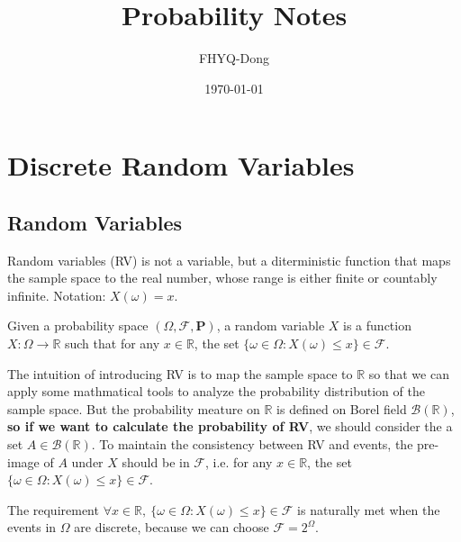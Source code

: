 \documentclass[device=normal, lang=en, fontsize=12pt]{elegantnote}
\title{Probability Notes}
\author{FHYQ-Dong}
\date{\today}
\numberwithin{equation}{section}
\theoremstyle{definition} %
\begin{document}
\maketitle
\newpage
\tableofcontents
\newpage






\section{Discrete Random Variables}
\subsection{Random Variables}
Random variables (RV) is not a variable, but a diterministic function that maps the sample space to the real number, whose range is either finite or countably infinite. Notation: $X(\omega) = x$.
\begin{definition}
    Given a probability space $(\varOmega, \mathcal{F}, \mathbf{P})$, a random variable $X$ is a function $X: \varOmega \rightarrow \mathbb{R}$ such that for any $x \in \mathbb{R}$, the set $\{\omega \in \varOmega: X(\omega) \leq x\} \in \mathcal{F}$.
\end{definition}
The intuition of introducing RV is to map the sample space to $\mathbb{R}$ so that we can apply some mathmatical tools to analyze the probability distribution of the sample space. But the probability meature on $\mathbb{R}$ is defined on Borel field $\mathcal{B}(\mathbb{R})$, \textbf{so if we want to calculate the probability of RV}, we should consider the a set $A \in \mathcal{B}(\mathbb{R})$. To maintain the consistency between RV and events, the pre-image of $A$ under $X$ should be in $\mathcal{F}$, i.e. for any $x \in \mathbb{R}$, the set $\{\omega \in \varOmega: X(\omega) \leq x\} \in \mathcal{F}$.
\begin{remark}
    The requirement $\forall x \in \mathbb{R},~ \{\omega \in \varOmega: X(\omega) \leq x\} \in \mathcal{F}$ is naturally met when the events in $\varOmega$ are discrete, because we can choose $\mathcal{F} = 2^{\varOmega}$.
\end{remark}
\end{document}
